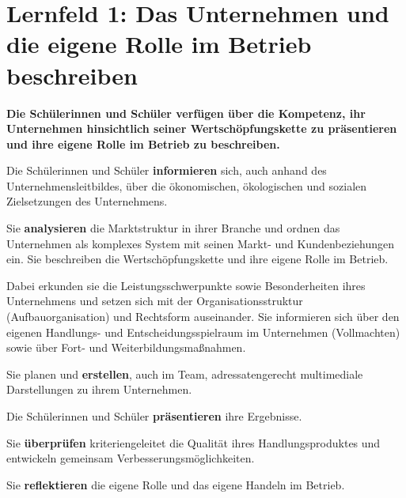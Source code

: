 \chapter{Lernfeld 1: Das Unternehmen und die eigene Rolle im Betrieb beschreiben}

\textbf{Die Schülerinnen und Schüler verfügen über die Kompetenz, ihr Unternehmen hinsichtlich seiner Wertschöpfungskette zu präsentieren und ihre eigene Rolle im Betrieb zu beschreiben.}

Die Schülerinnen und Schüler \textbf{informieren} sich, auch anhand des Unternehmensleitbildes,
über die ökonomischen, ökologischen und sozialen Zielsetzungen des Unternehmens.

Sie \textbf{analysieren} die Marktstruktur in ihrer Branche und ordnen das Unternehmen als komplexes System mit seinen Markt- und Kundenbeziehungen ein. Sie beschreiben die Wertschöpfungskette und ihre eigene Rolle im Betrieb.

Dabei erkunden sie die Leistungsschwerpunkte sowie Besonderheiten ihres Unternehmens
und setzen sich mit der Organisationsstruktur (Aufbauorganisation) und Rechtsform auseinander. Sie informieren sich über den eigenen Handlungs- und Entscheidungsspielraum im
Unternehmen (Vollmachten) sowie über Fort- und Weiterbildungsmaßnahmen.

Sie planen und \textbf{erstellen}, auch im Team, adressatengerecht multimediale Darstellungen zu
ihrem Unternehmen.

Die Schülerinnen und Schüler \textbf{präsentieren} ihre Ergebnisse.

Sie \textbf{überprüfen} kriteriengeleitet die Qualität ihres Handlungsproduktes und entwickeln gemeinsam Verbesserungsmöglichkeiten.

Sie \textbf{reflektieren} die eigene Rolle und das eigene Handeln im Betrieb.
















